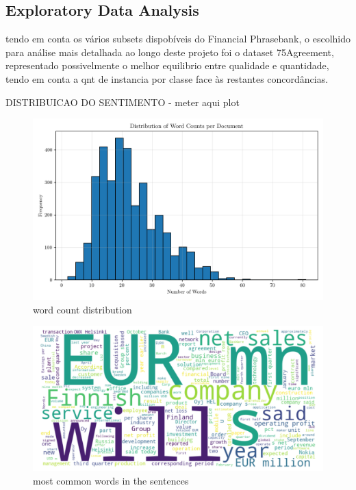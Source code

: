 \documentclass[conference]{IEEEtran}
\begin{document}


\subsection{Exploratory Data Analysis}

tendo em conta os vários subsets dispobíveis do Financial Phrasebank, o escolhido para análise mais detalhada ao longo deste projeto foi o dataset 75Agreement, representado possivelmente o melhor equilibrio entre qualidade e quantidade, tendo em conta a qnt de instancia por classe face às restantes concordâncias.

DISTRIBUICAO DO SENTIMENTO - meter aqui plot

\begin{figure}[H]
    \centering
    \includegraphics[width=1\linewidth]{assets/word_count_distribution.png}
    \caption{word count distribution}
    \label{fig:word_count_distribution}
\end{figure}

\begin{figure}[H]
    \centering
    \includegraphics[width=1\linewidth]{assets/word_cloud_75agree.png}
    \caption{most common words in the sentences}
    \label{fig:word_cloud_75agree}
\end{figure}
\end{document}
